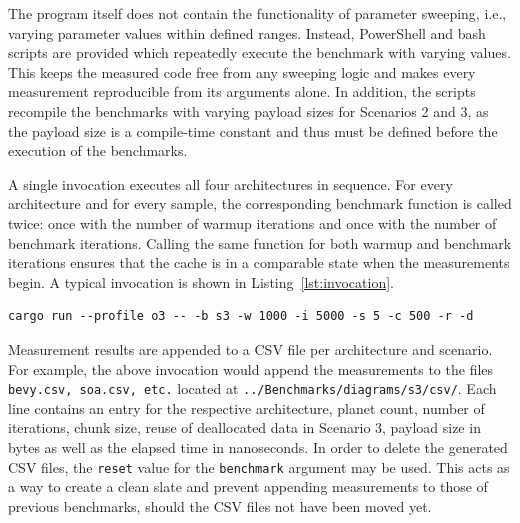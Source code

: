 The program itself does not contain the functionality of parameter sweeping, i.e., varying parameter values within defined ranges. Instead, PowerShell and bash scripts are provided which repeatedly execute the benchmark with varying values. This keeps the measured code free from any sweeping logic and makes every measurement reproducible from its arguments alone. In addition, the scripts recompile the benchmarks with varying payload sizes for Scenarios 2 and 3, as the payload size is a compile-time constant and thus must be defined before the execution of the benchmarks. 

A single invocation executes all four architectures in sequence. For every architecture and for every sample, the corresponding benchmark function is called twice: once with the number of warmup iterations and once with the number of benchmark iterations. Calling the same function for both warmup and benchmark iterations ensures that the cache is in a comparable state when the measurements begin. A typical invocation is shown in Listing~\ref{lst:invocation}.

\begin{lstlisting}[frame=none, numbers=none, basicstyle=\ttfamily, keywordstyle={}, commentstyle={}, stringstyle={}, caption={A benchmark invocation for Scenario 3 via the command line}, label={lst:invocation}]
    cargo run --profile o3 -- -b s3 -w 1000 -i 5000 -s 5 -c 500 -r -d
\end{lstlisting}

Measurement results are appended to a \ac{CSV} file per architecture and scenario. For example, the above invocation would append the measurements to the files \texttt{bevy.csv, soa.csv, etc.} located at \texttt{../Benchmarks/diagrams/s3/csv/}. Each line contains an entry for the respective architecture, planet count, number of iterations, chunk size, reuse of deallocated data in Scenario 3, payload size in bytes as well as the elapsed time in nanoseconds. In order to delete the generated \ac{CSV} files, the \texttt{reset} value for the \texttt{benchmark} argument may be used. This acts as a way to create a clean slate and prevent appending measurements to those of previous benchmarks, should the \ac{CSV} files not have been moved yet. 



